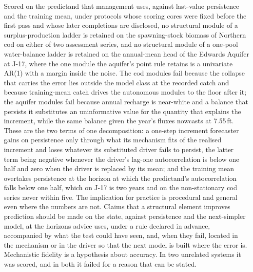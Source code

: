 Scored on the predictand that management uses, against last-value persistence and the training mean, under protocols whose scoring cores were fixed before the first pass and whose later completions are disclosed, no structural module of a surplus-production ladder is retained on the spawning-stock biomass of Northern cod on either of two assessment series, and no structural module of a one-pool water-balance ladder is retained on the annual-mean head of the Edwards Aquifer at J-17, where the one module the aquifer's point rule retains is a univariate AR(1) with a margin inside the noise. The cod modules fail because the collapse that carries the error lies outside the model class at the recorded catch and because training-mean catch drives the autonomous modules to the floor after it; the aquifer modules fail because annual recharge is near-white and a balance that persists it substitutes an uninformative value for the quantity that explains the increment, while the same balance given the year's fluxes nowcasts at 7.55\,ft. These are the two terms of one decomposition: a one-step increment forecaster gains on persistence only through what its mechanism fits of the realised increment and loses whatever its substituted driver fails to persist, the latter term being negative whenever the driver's lag-one autocorrelation is below one half and zero when the driver is replaced by its mean; and the training mean overtakes persistence at the horizon at which the predictand's autocorrelation falls below one half, which on J-17 is two years and on the non-stationary cod series never within five. The implication for practice is procedural and general even where the numbers are not. Claims that a structural element improves prediction should be made on the state, against persistence and the next-simpler model, at the horizons advice uses, under a rule declared in advance, accompanied by what the test could have seen, and, when they fail, located in the mechanism or in the driver so that the next model is built where the error is. Mechanistic fidelity is a hypothesis about accuracy. In two unrelated systems it was scored, and in both it failed for a reason that can be stated.
